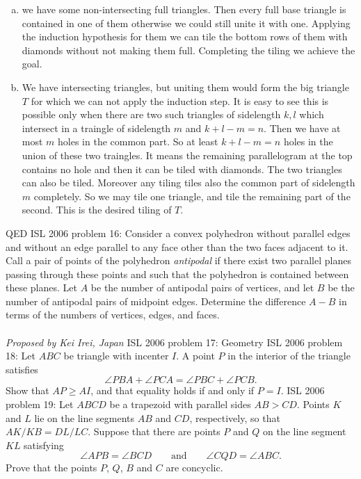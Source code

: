 \begin{enumerate}[a)]
  \item we have some non-intersecting full triangles. Then every full base triangle is contained in one of them otherwise we could still unite it with one. Applying the induction hypothesis for them we can tile the bottom rows of them with diamonds without not making them full. Completing the tiling we achieve the goal.
  \item We have intersecting triangles, but uniting them would form the big triangle $ T$ for which we can not apply the induction step. It is easy to see this is possible only when there are two such triangles of sidelength $ k,l$ which intersect in a traingle of sidelength $ m$ and $ k+l-m=n$. Then we have at most $ m$ holes in the common part. So at least $ k+l-m=n$ holes in the union of these two traingles.  It means the remaining parallelogram at the top contains no hole and then it can be tiled with diamonds. The two triangles can also be tiled. Moreover any tiling tiles also the common part of sidelength $ m$ completely. So we may tile one triangle, and tile the remaining part of the second. This is the desired tiling of $ T$.
\end{enumerate}
QED 
ISL 2006 problem 16:  Consider a convex polyhedron without parallel edges and without an edge parallel to any face other than the two faces adjacent to it. Call a pair of points of the polyhedron \textit{antipodal} if there exist two parallel planes passing through these points and such that the polyhedron is contained between these planes. Let $A$ be the number of antipodal pairs of vertices, and let $B$ be the number of antipodal pairs of midpoint edges. Determine the difference $A-B$ in terms of the numbers of vertices, edges, and faces. \\\\
\textit{Proposed by Kei Irei, Japan} 
ISL 2006 problem 17:  Geometry 
ISL 2006 problem 18:  Let $ABC$ be triangle with incenter $I$. A point $P$ in the interior of the triangle satisfies
\[ \angle PBA+\angle PCA = \angle PBC+\angle PCB. \]
Show that $AP \geq AI$, and that equality holds if and only if $P=I$. 
ISL 2006 problem 19:  Let $ ABCD$ be a trapezoid with parallel sides $ AB > CD$. Points $ K$ and $ L$ lie on the line segments $ AB$ and $ CD$, respectively, so that $AK/KB=DL/LC$. Suppose that there are points $ P$ and $ Q$ on the line segment $ KL$ satisfying
\[ \angle{APB} = \angle{BCD}\qquad\text{and}\qquad \angle{CQD} = \angle{ABC}. \]
Prove that the points $ P$, $ Q$, $ B$ and $ C$ are concyclic. \\\\
